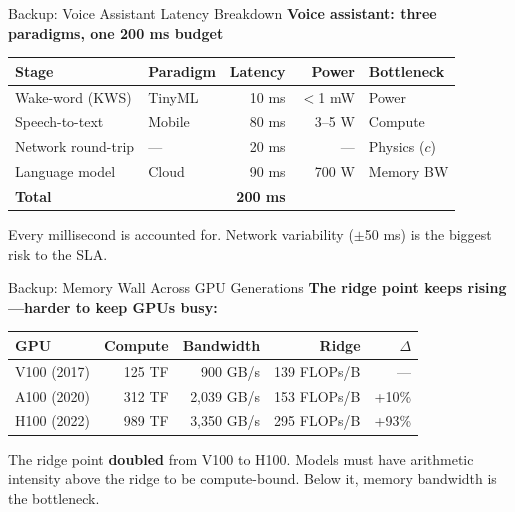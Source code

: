 \documentclass[aspectratio=169, 12pt]{beamer}
\begin{document}
\appendix

\begin{frame}{Backup: Voice Assistant Latency Breakdown}
\note{
%
}
\small
\textbf{Voice assistant: three paradigms, one 200 ms budget}

\vspace{0.15cm}
\renewcommand{\arraystretch}{1.15}
{\footnotesize
\begin{tabular}{@{}llrrl@{}}
  \toprule
  \textbf{Stage} & \textbf{Paradigm} & \textbf{Latency} & \textbf{Power} & \textbf{Bottleneck} \\
  \midrule
  Wake-word (KWS)     & TinyML & 10 ms  & $<$1 mW & Power \\
  Speech-to-text      & Mobile & 80 ms  & 3--5 W  & Compute \\
  Network round-trip  & ---    & 20 ms  & ---     & Physics ($c$) \\
  Language model      & Cloud  & 90 ms  & 700 W   & Memory BW \\
  \midrule
  \textbf{Total}      &        & \textbf{200 ms} & & \\
  \bottomrule
\end{tabular}
}

\vspace{0.15cm}
Every millisecond is accounted for. Network variability ($\pm$50 ms) is the biggest risk to the SLA.
\end{frame}

\begin{frame}{Backup: Memory Wall Across GPU Generations}
\note{
%
}
\small
\textbf{The ridge point keeps rising---harder to keep GPUs busy:}

\vspace{0.15cm}
\renewcommand{\arraystretch}{1.15}
{\footnotesize
\begin{tabular}{@{}lrrrr@{}}
  \toprule
  \textbf{GPU} & \textbf{Compute} & \textbf{Bandwidth} & \textbf{Ridge} & \textbf{$\Delta$} \\
  \midrule
  V100 (2017) & 125 TF & 900 GB/s & 139 FLOPs/B & --- \\
  A100 (2020) & 312 TF & 2,039 GB/s & 153 FLOPs/B & +10\% \\
  H100 (2022) & 989 TF & 3,350 GB/s & 295 FLOPs/B & +93\% \\
  \bottomrule
\end{tabular}
}

\vspace{0.15cm}
The ridge point \textbf{doubled} from V100 to H100. Models must have arithmetic intensity above the ridge to be compute-bound. Below it, memory bandwidth is the bottleneck.
\end{frame}
\end{document}
